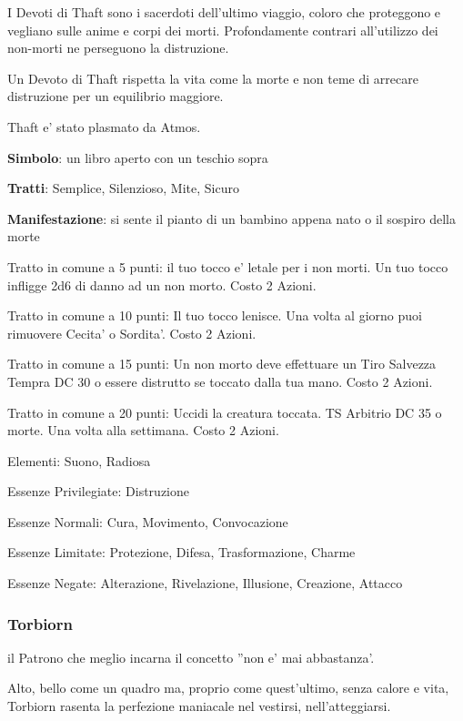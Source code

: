 \documentclass[a4paper,11pt,twoside,openany]{book}
\begin{document}
{I Devoti di Thaft sono i sacerdoti dell'ultimo viaggio, coloro che proteggono e vegliano sulle anime e corpi dei morti. Profondamente contrari all'utilizzo dei non-morti ne perseguono la distruzione.

Un Devoto di Thaft rispetta la vita come la morte e non teme di arrecare distruzione per un equilibrio maggiore.

Thaft e' stato plasmato da Atmos.

\textbf{Simbolo}: un libro aperto con un teschio sopra

\textbf{Tratti}: Semplice, Silenzioso, Mite, Sicuro

\textbf{Manifestazione}: si sente il pianto di un bambino appena nato o il sospiro della morte

\bigskip

Tratto in comune a 5 punti: il tuo tocco e' letale per i non morti. Un tuo tocco infligge 2d6 di danno ad un non morto. Costo 2 Azioni.

Tratto in comune a 10 punti: Il tuo tocco lenisce. Una volta al giorno puoi rimuovere Cecita' o Sordita'. Costo 2 Azioni.

Tratto in comune a 15 punti: Un non morto deve effettuare un Tiro Salvezza Tempra DC 30 o essere distrutto se toccato dalla tua mano. Costo 2 Azioni.

Tratto in comune a 20 punti: Uccidi la creatura toccata. TS Arbitrio DC 35 o morte. Una volta alla settimana. Costo 2 Azioni.

\bigskip

Elementi: Suono, Radiosa

\bigskip

Essenze Privilegiate: Distruzione

Essenze Normali: Cura, Movimento, Convocazione

Essenze Limitate: Protezione, Difesa, Trasformazione, Charme

Essenze Negate: Alterazione, Rivelazione, Illusione, Creazione, Attacco

\subsubsection{Torbiorn}

\label{torbiorn}

il Patrono che meglio incarna il concetto ''non e' mai abbastanza'.

Alto, bello come un quadro ma, proprio come quest'ultimo, senza calore e vita, Torbiorn rasenta la perfezione maniacale nel vestirsi, nell'atteggiarsi.

}
\end{document}
